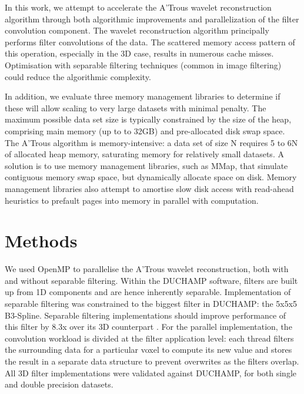 In this work, we attempt to accelerate the A'Trous wavelet reconstruction algorithm through both algorithmic improvements and parallelization of the filter convolution component. The wavelet reconstruction algorithm  principally performs filter convolutions of the data. The scattered memory access pattern of this operation, especially in the 3D case, results in numerous cache misses.  Optimisation with separable filtering techniques (common in image filtering) could reduce the algorithmic complexity. 

In addition, we evaluate three memory management libraries to determine if these will allow scaling to very large datasets with minimal penalty. The maximum possible data set size is typically constrained by the size of the heap, comprising main memory (up to to 32GB) and pre-allocated disk swap space.  The A'Trous algorithm is memory-intensive: a data set of size N requires 5 to 6N of allocated heap memory, saturating memory for relatively small datasets. A solution  is to use memory management libraries, such as MMap\citep{mmap2012}, that simulate contiguous memory swap space, but dynamically allocate space on disk. Memory management libraries also attempt to amortise slow disk access with read-ahead heuristics to prefault pages into memory in parallel with computation.

\section{Methods}

We used OpenMP to parallelise the  A'Trous wavelet reconstruction, both with and without separable filtering.  Within the DUCHAMP software, filters are built up from 1D components and are hence inherently separable.  Implementation of separable filtering was constrained to the biggest filter in DUCHAMP: the  5x5x5 B3-Spline. Separable filtering implementations should  improve performance of this filter by 8.3x over its 3D counterpart \citep{Solomon2010}. For the parallel implementation, the convolution workload is divided at the filter application level: each  thread filters the surrounding data for a particular voxel to compute its new value and stores the result in a separate data structure to prevent overwrites as the filters overlap.  All  3D filter implementations were validated against  DUCHAMP, for both single and double precision datasets.

